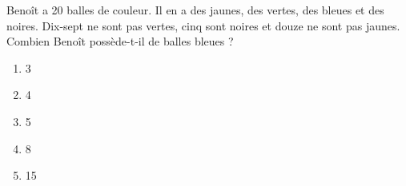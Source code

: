 Benoît a 20 balles de couleur. Il en a des jaunes, des vertes, des bleues et des noires. Dix-sept ne sont pas vertes, cinq sont noires et douze ne sont pas jaunes. Combien Benoît possède-t-il de balles bleues ?
\begin{multicols}{5}
  \begin{enumerate}[A/]
  \item 3
  \item 4
  \item 5
  \item 8
  \item 15
  \end{enumerate}
\end{multicols}